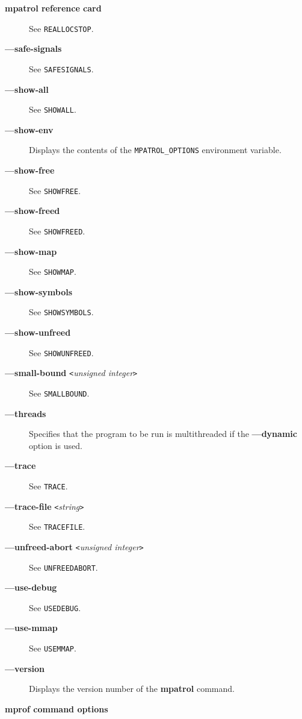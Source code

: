 \documentclass[a4paper,landscape,final]{article}
\newcommand{\heading}[1]{\textbf{\normalsize #1}}
\newcommand{\command}[1]{\textbf{#1}}
\newcommand{\flag}[1]{\textbf{---#1}}
\newcommand{\flagpar}[2]{\flag{#1} \texttt{<}\textit{#2}\texttt{>}}
\newcommand{\option}[1]{\texttt{#1}}
\begin{document}
\begin{multicols}{3}{\textbf{\Large mpatrol reference card}}
\begin{description}
\hfill See \option{REALLOCSTOP}.
\item[\flag{safe-signals}]
\hfill See \option{SAFESIGNALS}.
\item[\flag{show-all}]
\hfill See \option{SHOWALL}.
\item[\flag{show-env}]
Displays the contents of the \texttt{MPATROL\_OPTIONS} environment variable.
\item[\flag{show-free}]
\hfill See \option{SHOWFREE}.
\item[\flag{show-freed}]
\hfill See \option{SHOWFREED}.
\item[\flag{show-map}]
\hfill See \option{SHOWMAP}.
\item[\flag{show-symbols}]
\hfill See \option{SHOWSYMBOLS}.
\item[\flag{show-unfreed}]
\hfill See \option{SHOWUNFREED}.
\item[\flagpar{small-bound}{unsigned integer}]
\hfill See \option{SMALLBOUND}.
\item[\flag{threads}]
Specifies that the program to be run is multithreaded if the \flag{dynamic}
option is used.
\item[\flag{trace}]
\hfill See \option{TRACE}.
\item[\flagpar{trace-file}{string}]
\hfill See \option{TRACEFILE}.
\item[\flagpar{unfreed-abort}{unsigned integer}]
\hfill See \option{UNFREEDABORT}.
\item[\flag{use-debug}]
\hfill See \option{USEDEBUG}.
\item[\flag{use-mmap}]
\hfill See \option{USEMMAP}.
\item[\flag{version}]
Displays the version number of the \command{mpatrol} command.
\end{description}

\vskip 12pt
\heading{mprof command options}
\vskip 6pt


\end{multicols}
\end{document}
